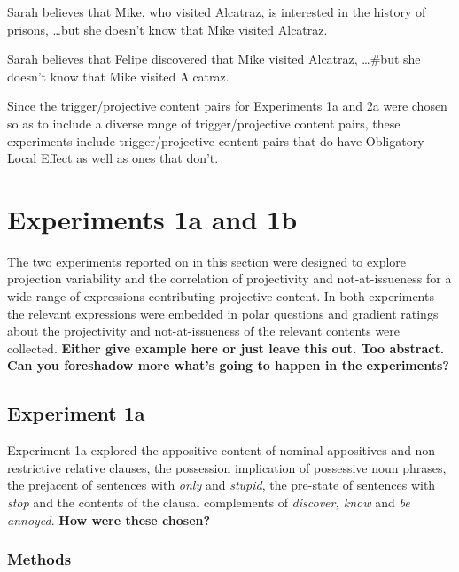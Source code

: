 \documentclass[11pt,fleqn]{article}
\newcommand{\6}{\mbox{$[\hspace*{-.6mm}[$}}
\newcommand{\9}{\mbox{$]\hspace*{-.6mm}]$}}
\begin{document}
\begin{exe}
\ex\label{ole}
\begin{xlist}
\ex Sarah believes that Mike, who visited Alcatraz, is interested in the history of prisons, \ldots but she doesn't know that Mike visited Alcatraz.

\ex Sarah believes that Felipe discovered that Mike visited Alcatraz, \ldots \#but she doesn't know that Mike visited Alcatraz. 

\end{xlist}
\end{exe}

Since the trigger/projective content pairs for Experiments 1a and 2a were chosen so as to include a diverse range of trigger/projective content pairs, these experiments include trigger/projective content pairs that do have Obligatory Local Effect as well as ones that don't. 

\section{Experiments 1a and 1b}\label{s3}

The two experiments reported on in this section were designed to explore projection variability and the correlation of projectivity and not-at-issueness for a wide range of expressions contributing projective content. In both experiments the relevant expressions were embedded in polar questions and gradient ratings about the projectivity and not-at-issueness of the relevant contents were collected. {\bf Either give example here or just leave this out. Too abstract. Can you foreshadow more what’s going to happen in the experiments?}

\subsection{Experiment 1a} 

Experiment 1a explored the appositive content of nominal appositives and non-restrictive relative clauses, the possession implication of possessive noun phrases, the prejacent of sentences with {\em only} and {\em stupid}, the pre-state of sentences with {\em stop} and the contents of the clausal complements of {\em discover, know} and {\em be annoyed}. {\bf How were these chosen?}

\subsubsection{Methods}\label{s-methods-1a}
\end{document}
